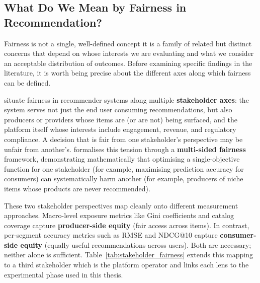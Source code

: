 \documentclass[11pt,a4paper]{report}
\begin{document}
\subsection*{What Do We Mean by Fairness in Recommendation?}

Fairness is not a single, well-defined concept it is a family of related but distinct concerns that depend on whose interests we are evaluating and what we consider an acceptable distribution of outcomes. Before examining specific findings in the literature, it is worth being precise about the different axes along which fairness can be defined.

\citet{ekstrand2022fairness} situate fairness in recommender systems along multiple \textbf{stakeholder axes}: the system serves not just the end user consuming recommendations, but also producers or providers whose items are (or are not) being surfaced, and the platform itself whose interests include engagement, revenue, and regulatory compliance. A decision that is fair from one stakeholder's perspective may be unfair from another's. \citet{burke2017multisided} formalises this tension through a \textbf{multi-sided fairness} framework, demonstrating mathematically that optimising a single-objective function for one stakeholder (for example, maximising prediction accuracy for consumers) can systematically harm another (for example, producers of niche items whose products are never recommended).

These two stakeholder perspectives map cleanly onto different measurement approaches. Macro-level exposure metrics like Gini coefficients and catalog coverage capture \textbf{producer-side equity} (fair access across items). In contrast, per-segment accuracy metrics such as RMSE and NDCG@10 \citep{jarvelin2002cumulated} capture \textbf{consumer-side equity} (equally useful recommendations across users). Both are necessary; neither alone is sufficient. Table~\ref{tab:stakeholder_fairness} extends this mapping to a third stakeholder which is the platform operator and links each lens to the experimental phase used in this thesis.
\end{document}
